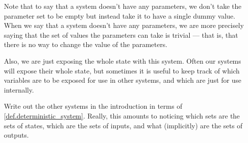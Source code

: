 \documentclass[DynamicalBook]{subfiles}
\begin{document}
Note that to say that a system doesn't have any parameters, we don't take the
parameter set to be empty but instead take it to have a single dummy value. When
we say that a system doesn't have any parameters, we are more precisely saying
that the set of values the parameters can take is trivial --- that is, that
there is no way to change the value of the parameters. 

Also, we are just exposing the whole state with this system. Often our systems
will expose their whole state, but sometimes it is useful to keep track of which
variables are to be exposed for use in other systems, and which are just for use internally. 

\begin{exercise}
  Write out the other systems in the introduction in terms of
  \cref{def.deterministic_system}. Really, this amounts to noticing which sets
  are the sets of states, which are the sets of inputs, and what (implicitly)
  are the sets of outputs.
\end{exercise}
\end{document}
